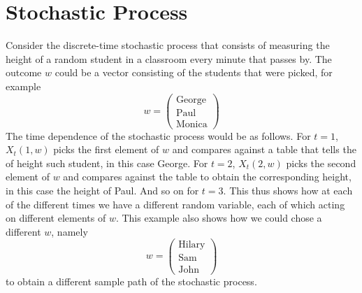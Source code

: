 \documentclass[a4paper,12pt]{article}
\begin{document}
\section{Stochastic Process}
Consider the discrete-time stochastic process that consists of measuring the height of a random student in a classroom every minute that passes by. The outcome $w$ could be a vector consisting of the students that were picked, for example
\begin{equation}
w = \begin{pmatrix} \text{George} \\ \text{Paul} \\ \text{Monica} \end{pmatrix}
\end{equation}
The time dependence of the stochastic process would be as follows. For $t=1$, $X_t(1,w)$ picks the first element of $w$ and compares against a table that tells the of height such student, in this case George. For $t=2$, $X_t(2,w)$ picks the second element of $w$ and compares against the table to obtain the corresponding height, in this case the height of Paul. And so on for $t=3$. This thus shows how at each of the different times we have a different random variable, each of which acting on different elements of $w$.  This example also shows how we could chose a different $w$, namely
\begin{equation}
w = \begin{pmatrix} \text{Hilary} \\ \text{Sam} \\ \text{John} \end{pmatrix}
\end{equation}
to obtain a different sample path of the stochastic process. 
\end{document}
